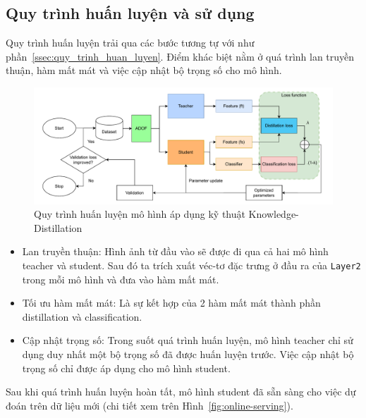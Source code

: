 \subsection{Quy trình huấn luyện và sử dụng}
%
Quy trình huấn luyện trải qua các bước tương tự với như phần~\ref{ssec:quy_trinh_huan_luyen}.
%
Điểm khác biệt nằm ở quá trình lan truyền thuận, hàm mất mát và việc cập nhật bộ trọng số cho mô hình.
%
%
\begin{figure}[h!]
	\centering
	\includegraphics[width=1.0\linewidth]{Images/offline-training-process-distillation.pdf}
	\begin{minipage}{1.0\linewidth}
		\vspace{5mm}
		\caption{Quy trình huấn luyện mô hình áp dụng kỹ thuật Knowledge-Distillation}
		\label{fig:offline-training-process-distillation}
	\end{minipage}
\end{figure}
%
\begin{itemize}
	\item Lan truyền thuận: Hình ảnh từ đầu vào sẽ được đi qua cả hai mô hình \gls{teacher} và \gls{student}. Sau đó ta trích xuất véc-tơ đặc trưng ở đầu ra của \texttt{Layer2} trong mỗi mô hình và đưa vào hàm mất mát.
	
	\item  Tối ưu hàm mất mát: Là sự kết hợp của 2 hàm mất mát thành phần \gls{distillation} và \gls{classification}.
	
	\item Cập nhật trọng số: Trong suốt quá trình huấn luyện, mô hình \gls{teacher} chỉ sử dụng duy nhất một bộ trọng số đã được huấn luyện trước. Việc cập nhật bộ trọng số chỉ được áp dụng cho mô hình \gls{student}.
\end{itemize}

Sau khi quá trình huấn luyện hoàn tất, mô hình \gls{student} đã sẵn sàng cho việc dự đoán trên dữ liệu mới (chi tiết xem trên Hình~\ref{fig:online-serving}). 







